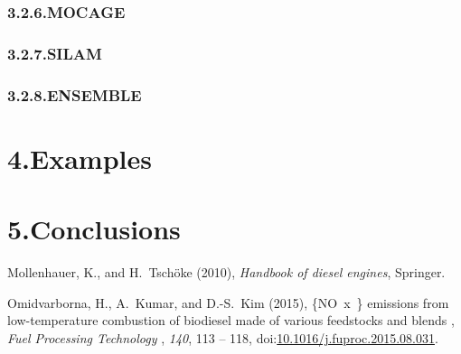 \documentclass[9pt]{report}
\begin{document}
\subsubsection{3.2.6.\hspace*{0.5em}MOCAGE}\label{sec-mocage}%

\subsubsection{3.2.7.\hspace*{0.5em}SILAM}\label{sec-silam}%

\subsubsection{3.2.8.\hspace*{0.5em}ENSEMBLE}\label{sec-ensemble}%

\section{4.\hspace*{0.5em}Examples}\label{sec-examples}%

\section{5.\hspace*{0.5em}Conclusions}\label{sec-conclusions}%

{\mdsupressbiblabel{}\begin{thebibliography}{2}%
\label{sec-bibliography}%

\mdbibitemlabel{}Mollenhauer, K., and H.~Tschöke (2010), \emph{Handbook of diesel engines}, Springer.\label{mollenhauer2010handbook}%

\mdbibitemlabel{}Omidvarborna, H., A.~Kumar, and D.-S.~Kim (2015), \{NO~x~\} emissions from low-temperature combustion of biodiesel made of various feedstocks and blends , \emph{Fuel Processing Technology }, \emph{140}, 113 – 118, doi:\href{https://dx.doi.org/10.1016/j.fuproc.2015.08.031}{10.1016/j.fuproc.2015.08.031}.\label{omidvarborna2015113}%
\par%
\end{thebibliography}}%
\end{document}
